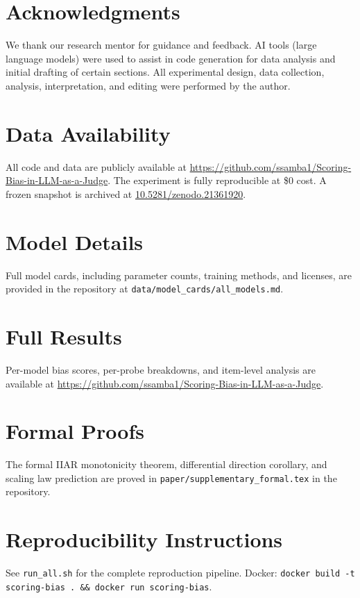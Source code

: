 \documentclass[11pt,twocolumn]{article}
\begin{document}
\section*{Acknowledgments}
We thank our research mentor for guidance and feedback. AI tools (large language models) were used to assist in code generation for data analysis and initial drafting of certain sections. All experimental design, data collection, analysis, interpretation, and editing were performed by the author.

\section*{Data Availability}
All code and data are publicly available at \url{https://github.com/ssamba1/Scoring-Bias-in-LLM-as-a-Judge}. The experiment is fully reproducible at \$0 cost. A frozen snapshot is archived at \href{https://doi.org/10.5281/zenodo.21361920}{10.5281/zenodo.21361920}.




\appendix
\section{Model Details}
\label{app:models}
Full model cards, including parameter counts, training methods, and licenses, are provided in the repository at \texttt{data/model\_cards/all\_models.md}.

\section{Full Results}
\label{app:results}
Per-model bias scores, per-probe breakdowns, and item-level analysis are available at \url{https://github.com/ssamba1/Scoring-Bias-in-LLM-as-a-Judge}.

\section{Formal Proofs}
\label{app:proofs}
The formal IIAR monotonicity theorem, differential direction corollary, and scaling law prediction are proved in \texttt{paper/supplementary\_formal.tex} in the repository.

\section{Reproducibility Instructions}
\label{app:reproduce}
See \texttt{run\_all.sh} for the complete reproduction pipeline. Docker: \texttt{docker build -t scoring-bias . \&\& docker run scoring-bias}.
\end{document}
